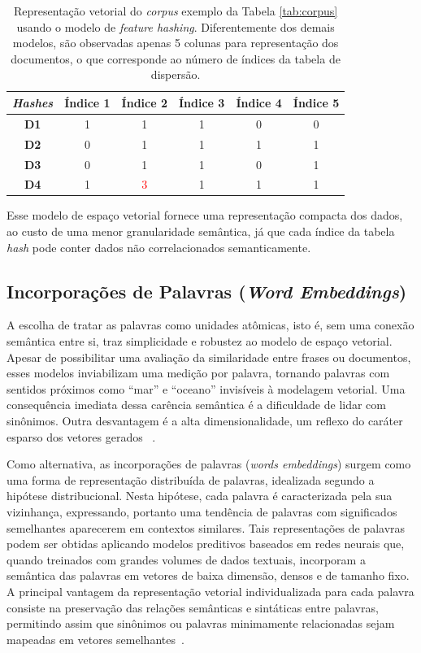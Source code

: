 \documentclass{SBCbookchapter}
\begin{document}
\begin{table}[h]
\centering
\caption{Representação vetorial do \textit{corpus} exemplo da Tabela \ref{tab:corpus} usando o modelo de \textit{feature hashing}. Diferentemente dos demais modelos, são observadas apenas 5 colunas para representação dos documentos, o que corresponde ao número de índices da tabela de dispersão.}
\footnotesize
\begin{tabular}{cccccc}
\textbf{\textit{Hashes}} & \textbf{Índice 1} & \textbf{Índice 2} & \textbf{Índice 3} & \textbf{Índice 4} & \textbf{Índice 5} \\ 
\hline\hline
\textbf{D1}     & 1  &   1   &   1   &   0   & 0\\ 
\hline
\textbf{D2}     & 0  &   1   &   1   &   1   & 1\\ 
\hline
\textbf{D3}     & 0  &   1   &   1   &   0   & 1\\ 
\hline
\textbf{D4}     & 1  &   \textcolor{red}{3}   &   1   &   1   & 1
\end{tabular}
\label{tab:hash}
\end{table}

Esse modelo de espaço vetorial fornece uma representação compacta dos dados, ao custo de uma menor granularidade semântica, já que cada índice da tabela \textit{hash} pode conter dados não correlacionados semanticamente.

\subsection{Incorporações de Palavras (\textit{Word Embeddings})}

A escolha de tratar as palavras como unidades atômicas, isto é, sem uma conexão semântica entre si, traz simplicidade e robustez ao modelo de espaço vetorial. Apesar de possibilitar uma avaliação da similaridade entre frases ou documentos, esses modelos inviabilizam uma medição por palavra, tornando palavras com sentidos próximos como ``mar'' e ``oceano'' invisíveis à modelagem vetorial. Uma consequência imediata dessa carência semântica é a dificuldade de lidar com sinônimos. Outra desvantagem é a alta dimensionalidade, um reflexo do caráter esparso dos vetores gerados
~\cite{camacho2018word,mikolov2013efficient}.

Como alternativa, as incorporações de palavras (\textit{words embeddings}) surgem como uma forma de representação distribuída de palavras, idealizada segundo a hipótese distribucional. Nesta hipótese, cada palavra é caracterizada pela sua vizinhança, expressando, portanto uma tendência de palavras com significados semelhantes aparecerem em contextos similares\cite{firth1957}. Tais representações de palavras podem ser obtidas aplicando modelos preditivos baseados em redes neurais que, quando treinados com grandes volumes de dados textuais, incorporam a semântica das palavras em vetores de baixa dimensão, densos e de tamanho fixo. A principal vantagem da representação vetorial individualizada para cada palavra consiste na preservação das relações semânticas e sintáticas entre palavras, permitindo assim que sinônimos ou palavras minimamente relacionadas sejam mapeadas em vetores semelhantes~\cite{li2015word}. %
\end{document}
